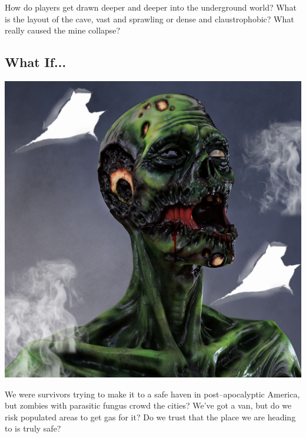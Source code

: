 \documentclass[a4,landscape]{book}
\begin{document}
\begin{multicols*}{4}
How do players get drawn deeper and deeper into the underground world?
What is the layout of the cave, vast and sprawling or dense and claustrophobic?
What really caused the mine collapse?

\subsection*{What If...}

\includegraphics[width=\columnwidth]{./zombie}

We were survivors trying to make it to a safe haven in post--apocalyptic America, but zombies with parasitic fungus crowd the cities?
We've got a van, but do we risk populated areas to get gas for it?
Do we trust that the place we are heading to is truly safe? \\



\end{multicols*}
\end{document}
